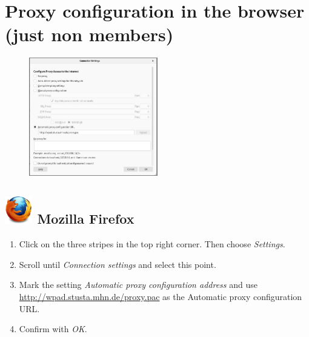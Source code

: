 \documentclass[a4paper,12pt]{scrartcl}
\begin{document}
\newpage

\section*{Proxy configuration in the browser (just non members)}

\begin{figure}
	\vspace{-40pt}
	\begin{center}
		\includegraphics[width=0.5\textwidth,keepaspectratio]{Bilder/firefox_en_stusta}
	\end{center}
\end{figure}

\subsection*{\includegraphics[height=1.2cm,keepaspectratio]{Bilder/Firefox_35_logo} Mozilla Firefox}
\begin{enumerate}
	\item Click on the three stripes in the top right corner. Then choose \emph{Settings}.
	\item Scroll until \emph{Connection settings} and select this point.
	\item Mark the setting \emph{Automatic proxy configuration address} and use \\ \url{http://wpad.stusta.mhn.de/proxy.pac} as the Automatic proxy configuration URL.
	\item Confirm with \emph{OK}.\\
	\\
	\\
\end{enumerate}
\end{document}
